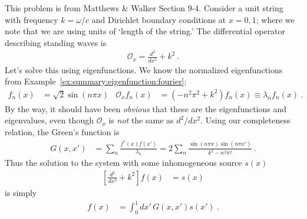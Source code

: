 \begin{example}
This problem is from Matthews \& Walker Section 9-4. Consider a unit string with frequency $k= \omega/c$ and Dirichlet boundary conditions at $x=0,1$; where we note that we are using units of `length of the string.' The differential operator describing standing waves is
\begin{align}
  \mathcal O_x = \frac{d^2}{dx^2} + k^2 \ .
 \end{align}
Let's solve this using eigenfunctions. We know the normalized eigenfunctions from Example~\ref{ex:summary:eigenfunction:fourier}:
\begin{align}
  f_n(x) &= \sqrt{2} \sin (n\pi x) 
  &
  \mathcal O_x f_n(x) 
  & = \left(-n^2\pi^2 + k^2\right)f_n(x) \equiv \lambda_n f_n(x) \ .
\end{align}
By the way, it should  have been \emph{obvious} that these are the eigenfunctions and eigenvalues, even though $\mathcal O_x$ is \emph{not} the same as $d^2/dx^2$. Using our completeness relation, the Green's function is
\begin{align}
  G(x,x') &= \sum_n \frac{f^*(x)f(x')}{\lambda_n}
  =
  2\sum_n\frac{\sin(n\pi x) \sin (n\pi x')}{k^2 - n^2\pi^2} \ .
\end{align}
Thus the solution to the system with some inhomogeneous source $s(x)$
\begin{align}
  \left[\frac{d^2}{dx^2} + k^2\right] f(x) &= s(x)
\end{align}
is simply
\begin{align}
  f(x) &= \int_0^1 dx' \, G(x,x') s(x') \ .
\end{align}
\end{example}

